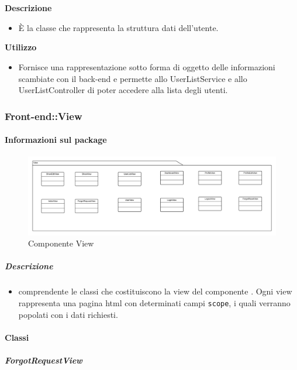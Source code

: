 				\textbf{\\ \\ Descrizione} 
					\begin{itemize}
						\item[] È la classe che rappresenta la struttura dati dell'utente.
					\end{itemize}      
				\textbf{Utilizzo}  
					\begin{itemize}
						\item[] Fornisce una rappresentazione sotto forma di oggetto delle informazioni scambiate con il back-end e permette allo UserListService e allo UserListController di poter accedere alla lista degli utenti.
					\end{itemize}
	\subsubsection{Front-end::View}
	\paragraph{Informazioni sul package} 
		\begin{figure}[H] 
			\begin{center} 
				\includegraphics[width=\textwidth]{uml/package/Front-end::View.png}  
				\caption{Componente View}
			\end{center}  
		\end{figure} 
	\subparagraph{Descrizione} 
		\begin{itemize}
		\item[]  comprendente le classi che costituiscono la view del componente . Ogni view rappresenta una pagina html con determinati campi \texttt{scope}, i quali verranno popolati con i dati richiesti.
		\end{itemize} 
		\paragraph{Classi}
			\subparagraph{ForgotRequestView}
				
